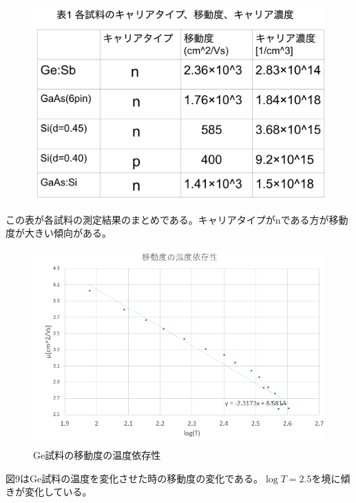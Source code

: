 \documentclass[dvipdfmx]{jsarticle}
\begin{document}
\begin{figure}[H]
\begin{center}
\includegraphics[scale = 0.4]{hyou.png}
\end{center}
\end{figure}

この表が各試料の測定結果のまとめである。キャリアタイプがnである方が移動度が大きい傾向がある。

\begin{figure}[H]
\begin{center}
\includegraphics[scale = 1]{idoudo.png}
\caption{Ge試料の移動度の温度依存性}
\end{center}
\end{figure}
図9はGe試料の温度を変化させた時の移動度の変化である。$\log{T} = 2.5$を境に傾きが変化している。
\end{document}
